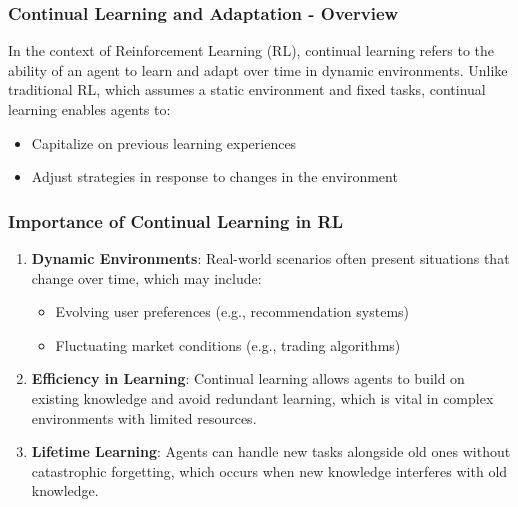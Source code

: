 \documentclass[aspectratio=169]{beamer}
\begin{document}
\begin{frame}[fragile]
    \frametitle{Continual Learning and Adaptation - Overview}
    In the context of Reinforcement Learning (RL), continual learning refers to the ability of an agent to learn and adapt over time in dynamic environments. Unlike traditional RL, which assumes a static environment and fixed tasks, continual learning enables agents to:
    \begin{itemize}
        \item Capitalize on previous learning experiences
        \item Adjust strategies in response to changes in the environment
    \end{itemize}
\end{frame}

\begin{frame}[fragile]
    \frametitle{Importance of Continual Learning in RL}
    \begin{enumerate}
        \item \textbf{Dynamic Environments}: 
        Real-world scenarios often present situations that change over time, which may include:
        \begin{itemize}
            \item Evolving user preferences (e.g., recommendation systems)
            \item Fluctuating market conditions (e.g., trading algorithms)
        \end{itemize}
        
        \item \textbf{Efficiency in Learning}: 
        Continual learning allows agents to build on existing knowledge and avoid redundant learning, which is vital in complex environments with limited resources.
        
        \item \textbf{Lifetime Learning}:
        Agents can handle new tasks alongside old ones without catastrophic forgetting, which occurs when new knowledge interferes with old knowledge.
    \end{enumerate}
\end{frame}
\end{document}
